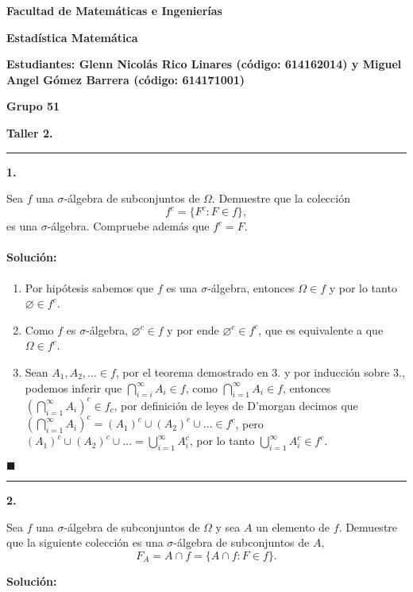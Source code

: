 \documentclass[11pt]{article}
\begin{document}
\begin{center}
    \textbf {Facultad de Matemáticas e Ingenierías}
    
    \textbf {Estadística Matemática}
    
    \textbf {Estudiantes: Glenn Nicolás Rico Linares (código: 614162014) y Miguel Angel Gómez Barrera (código: 614171001) }
    
    \textbf {Grupo 51}
    
    \textbf {Taller 2.}
    
\end{center}
\begin{center}\rule{1\textwidth}{0.1mm} \end{center}
\textbf{1.} \par
Sea $f$ una $\sigma$-álgebra de subconjuntos de $\Omega$. Demuestre que la colección
\[
    f^{c} = \{F^{c}: F \in f  \},
\]
es una $\sigma$-álgebra. Compruebe además que $f^{c} = F$.
\par
\paragraph{Solución:}
\begin{enumerate}[$i)$]
    \item Por hipótesis sabemos que $f$ es una $\sigma$-álgebra, entonces $\Omega \in f$ y por lo tanto $ \varnothing \in f^{c}$.
    \item Como $f$ es $\sigma$-álgebra, $\varnothing^c \in f$ y por ende $\varnothing^c \in f^c$, que es equivalente a que $\Omega \in f^c$.
    \item Sean $A_{1}, A_{2}, \dots  \in f$, por el teorema demostrado en $3.$ y por inducción sobre $3.$, podemos inferir que $\displaystyle\bigcap_{i= i}^{\infty} A_{i} \in f $, como $\displaystyle\bigcap_{i = 1}^{\infty} A_{i} \in f$, entonces $\left ( \displaystyle\bigcap_{i = 1}^{\infty} A_{i}\right)^{c} \in f_{c}$, por definición de leyes de D'morgan decimos que $\left(\displaystyle\bigcap_{i = 1}^{\infty} A_{i}\right)^{c} = (A_{1})^{c} \cup (A_{2})^{c}\cup  \dots \in f^{c}$, pero $(A_{1})^{c} \cup (A_{2})^{c}\cup \dots = \displaystyle\bigcup_{i=1}^{\infty} A_{i}^{c}$, por lo tanto $\displaystyle\bigcup_{i=1}^{\infty} A_{i}^{c} \in f^{c}$.
\end{enumerate}
$\blacksquare$
 \begin{center}\rule{1\textwidth}{0.1mm} \end{center}
\textbf{2.} \par
Sea $f$ una $\sigma$-álgebra de subconjuntos de $\Omega$ y sea $A$ un elemento de $f$. Demuestre que la siguiente colección es una $\sigma$-álgebra de subconjuntos de $A$,
\[
F_{A} = A \cap f = \{ A \cap f: F \in f\}.
\]
\par
\textbf{Solución:}
\end{document}
